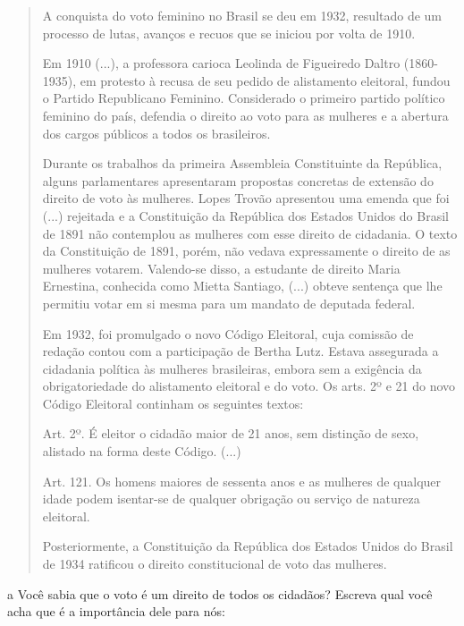 \begin{quote}
A conquista do voto feminino no Brasil se deu em 1932, resultado de um
processo de lutas, avanços e recuos que se iniciou por volta de 1910.

Em 1910 (...), a professora carioca Leolinda de Figueiredo Daltro
(1860-1935), em protesto à recusa de seu pedido de alistamento
eleitoral, fundou o Partido Republicano Feminino. Considerado o primeiro
partido político feminino do país, defendia o direito ao voto para as
mulheres e a abertura dos cargos públicos a todos os brasileiros.

Durante os trabalhos da primeira Assembleia Constituinte da República,
alguns parlamentares apresentaram propostas concretas de extensão do
direito de voto às mulheres. Lopes Trovão apresentou uma emenda que foi
(...) rejeitada e a Constituição da República dos Estados Unidos do
Brasil de 1891 não contemplou as mulheres com esse direito de cidadania.
O texto da Constituição de 1891, porém, não vedava expressamente o
direito de as mulheres votarem. Valendo-se disso, a estudante de direito
Maria Ernestina, conhecida como Mietta Santiago, (...) obteve sentença
que lhe permitiu votar em si mesma para um mandato de deputada federal.

Em 1932, foi promulgado o novo Código Eleitoral, cuja comissão de
redação contou com a participação de Bertha Lutz. Estava assegurada a
cidadania política às mulheres brasileiras, embora sem a exigência da
obrigatoriedade do alistamento eleitoral e do voto. Os arts. 2º e 21 do
novo Código Eleitoral continham os seguintes textos:

Art. 2º. É eleitor o cidadão maior de 21 anos, sem distinção de sexo,
alistado na forma deste Código. (...)

Art. 121. Os homens maiores de sessenta anos e as mulheres de qualquer
idade podem isentar-se de qualquer obrigação ou serviço de natureza
eleitoral.

Posteriormente, a Constituição da República dos Estados Unidos do Brasil
de 1934 ratificou o direito constitucional de voto das mulheres.

\end{quote}

\num{a} Você sabia que o voto é um direito de todos os cidadãos? Escreva qual
você acha que é a importância dele para nós:

